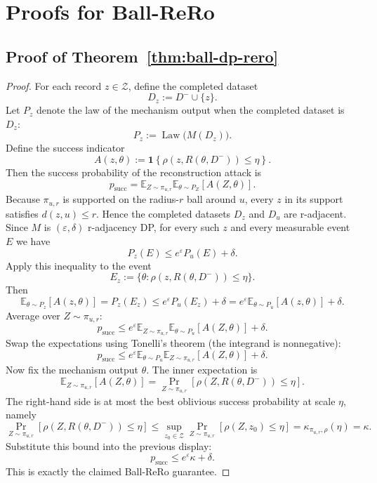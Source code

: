\documentclass[conference,compsoc]{IEEEtran}
\DeclareMathOperator{\Law}{Law}
\newcommand{\ind}[1]{\mathbf{1}\!\left\{#1\right\}}
\begin{document}
\section{Proofs for Ball-ReRo}
\label{app:proof-ball-rero}

\subsection{Proof of Theorem~\ref{thm:ball-dp-rero}}

\begin{proof}
For each record $z\in\mathcal{Z}$, define the completed dataset
\[
D_z:=D^-\cup\{z\}.
\]
Let $P_z$ denote the law of the mechanism output when the completed dataset is $D_z$:
\[
P_z:=\Law\big(M(D_z)\big).
\]
Define the success indicator
\[
A(z,\theta):=\ind{\rho(z,R(\theta,D^-))\le \eta}.
\]
Then the success probability of the reconstruction attack is
\[
p_{\mathrm{succ}}
=
\mathbb{E}_{Z\sim\pi_{u,r}}
\mathbb{E}_{\theta\sim P_Z}[A(Z,\theta)].
\]
Because $\pi_{u,r}$ is supported on the radius-$r$ ball around $u$, every $z$ in its support satisfies $d(z,u)\le r$. Hence the completed datasets $D_z$ and $D_u$ are r-adjacent. Since $M$ is $(\varepsilon,\delta)$ r-adjacency DP, for every such $z$ and every measurable event $E$ we have
\[
P_z(E)\le e^{\varepsilon}P_u(E)+\delta.
\]
Apply this inequality to the event
\[
E_z:=\{\theta: \rho(z,R(\theta,D^-))\le \eta\}.
\]
Then
\[
\mathbb{E}_{\theta\sim P_z}[A(z,\theta)]
=
P_z(E_z)
\le
 e^{\varepsilon}P_u(E_z)+\delta
=
 e^{\varepsilon}\mathbb{E}_{\theta\sim P_u}[A(z,\theta)]+\delta.
\]
Average over $Z\sim\pi_{u,r}$:
\[
p_{\mathrm{succ}}
\le
 e^{\varepsilon}
\mathbb{E}_{Z\sim\pi_{u,r}}
\mathbb{E}_{\theta\sim P_u}[A(Z,\theta)]
+\delta.
\]
Swap the expectations using Tonelli's theorem (the integrand is nonnegative):
\[
p_{\mathrm{succ}}
\le
 e^{\varepsilon}
\mathbb{E}_{\theta\sim P_u}
\mathbb{E}_{Z\sim\pi_{u,r}}[A(Z,\theta)]
+\delta.
\]
Now fix the mechanism output $\theta$. The inner expectation is
\[
\mathbb{E}_{Z\sim\pi_{u,r}}[A(Z,\theta)]
=
\Pr_{Z\sim\pi_{u,r}}[\rho(Z,R(\theta,D^-))\le \eta].
\]
The right-hand side is at most the best oblivious success probability at scale $\eta$, namely
\[
\Pr_{Z\sim\pi_{u,r}}[\rho(Z,R(\theta,D^-))\le \eta]
\le
\sup_{z_0\in\mathcal{Z}} \Pr_{Z\sim\pi_{u,r}}[\rho(Z,z_0)\le \eta]
=
\kappa_{\pi_{u,r},\rho}(\eta)
=
\kappa.
\]
Substitute this bound into the previous display:
\[
p_{\mathrm{succ}}\le e^{\varepsilon}\kappa+\delta.
\]
This is exactly the claimed Ball-ReRo guarantee.
\end{proof}
\end{document}
